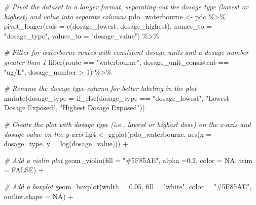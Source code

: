\documentclass[
]{article}
\newenvironment{Shaded}{\begin{snugshade}}{\end{snugshade}}
\newcommand{\AttributeTok}[1]{\textcolor[rgb]{0.77,0.63,0.00}{#1}}
\newcommand{\CommentTok}[1]{\textcolor[rgb]{0.56,0.35,0.01}{\textit{#1}}}
\newcommand{\ConstantTok}[1]{\textcolor[rgb]{0.00,0.00,0.00}{#1}}
\newcommand{\DecValTok}[1]{\textcolor[rgb]{0.00,0.00,0.81}{#1}}
\newcommand{\FloatTok}[1]{\textcolor[rgb]{0.00,0.00,0.81}{#1}}
\newcommand{\FunctionTok}[1]{\textcolor[rgb]{0.00,0.00,0.00}{#1}}
\newcommand{\NormalTok}[1]{#1}
\newcommand{\OtherTok}[1]{\textcolor[rgb]{0.56,0.35,0.01}{#1}}
\newcommand{\SpecialCharTok}[1]{\textcolor[rgb]{0.00,0.00,0.00}{#1}}
\newcommand{\StringTok}[1]{\textcolor[rgb]{0.31,0.60,0.02}{#1}}
\begin{document}
\begin{Shaded}
\begin{Highlighting}[]
\CommentTok{\# Pivot the dataset to a longer format, separating out the dosage type (lowest or highest) and value into separate columns}
\NormalTok{pdo\_waterbourne }\OtherTok{\textless{}{-}}\NormalTok{ pdo }\SpecialCharTok{\%\textgreater{}\%}
  \FunctionTok{pivot\_longer}\NormalTok{(}\AttributeTok{cols =} \FunctionTok{c}\NormalTok{(dosage\_lowest, dosage\_highest), }
               \AttributeTok{names\_to =} \StringTok{"dosage\_type"}\NormalTok{,}
               \AttributeTok{values\_to =} \StringTok{"dosage\_value"}\NormalTok{) }\SpecialCharTok{\%\textgreater{}\%} 
  
  \CommentTok{\# Filter for waterborne routes with consistent dosage units and a dosage number greater than 1}
  \FunctionTok{filter}\NormalTok{(route }\SpecialCharTok{==} \StringTok{"waterbourne"}\NormalTok{, dosage\_unit\_consistent }\SpecialCharTok{==} \StringTok{"ug/L"}\NormalTok{,}
\NormalTok{         dosage\_number }\SpecialCharTok{\textgreater{}} \DecValTok{1}\NormalTok{) }\SpecialCharTok{\%\textgreater{}\%}  
  
  \CommentTok{\# Rename the dosage type column for better labeling in the plot}
  \FunctionTok{mutate}\NormalTok{(}\AttributeTok{dosage\_type =} \FunctionTok{if\_else}\NormalTok{(dosage\_type }\SpecialCharTok{==} \StringTok{"dosage\_lowest"}\NormalTok{, }\StringTok{"Lowest Dosage Exposed"}\NormalTok{, }\StringTok{"Highest Dosage Exposed"}\NormalTok{)) }

\CommentTok{\# Create the plot with dosage type (i.e., lowest or highest dose) on the x{-}axis and dosage value on the y{-}axis}
\NormalTok{fig4 }\OtherTok{\textless{}{-}} \FunctionTok{ggplot}\NormalTok{(pdo\_waterbourne, }\FunctionTok{aes}\NormalTok{(}\AttributeTok{x =}\NormalTok{ dosage\_type, }\AttributeTok{y =} \FunctionTok{log}\NormalTok{(dosage\_value))) }\SpecialCharTok{+}
  
  \CommentTok{\# Add a violin plot }
  \FunctionTok{geom\_violin}\NormalTok{(}\AttributeTok{fill =} \StringTok{"\#5F85AE"}\NormalTok{, }\AttributeTok{alpha =}\FloatTok{0.2}\NormalTok{, }\AttributeTok{color =} \ConstantTok{NA}\NormalTok{, }\AttributeTok{trim =} \ConstantTok{FALSE}\NormalTok{) }\SpecialCharTok{+}

  \CommentTok{\# Add a boxplot }
  \FunctionTok{geom\_boxplot}\NormalTok{(}\AttributeTok{width =} \FloatTok{0.05}\NormalTok{, }\AttributeTok{fill =} \StringTok{"white"}\NormalTok{, }\AttributeTok{color =} \StringTok{"\#5F85AE"}\NormalTok{, }\AttributeTok{outlier.shape =} \ConstantTok{NA}\NormalTok{) }\SpecialCharTok{+}


\end{Highlighting}
\end{Shaded}
\end{document}
